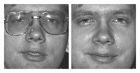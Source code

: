 \begin{figure}[ht]
\begin{center}
  \includegraphics[width=\columnwidth/10]{ch5/figures/feret11.jpg}
  \includegraphics[width=\columnwidth/10]{ch5/figures/feret12.jpg}\\

\end{center}
\end{figure}
